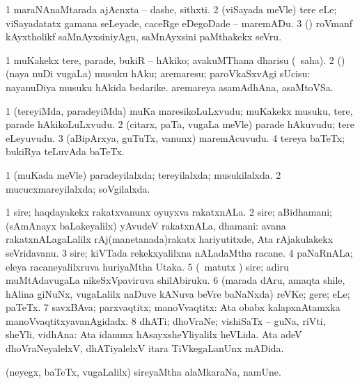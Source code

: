 \noindent 
\gl{\pagu}
\expl{}
\bmng
\bnum
\num{1}  maraNAnaMtarada ajAcnxta -- dashe, sithxti. 
\num{2}  (viSayada meVle) tere eLe; viSayadatatx gamana seLeyade, caceRge eDegoDade -- maremADu. 
\num{3}  (\kanmu) roVmanf kAyxtholikf saMnAyxsiniyAgu, saMnAyxsini paMthakekx seVru. 
\enum
\emng
\eentry

\bentry 
{} 
\gl{\sakirx}
\expl{}
\bmng
\bnum
\num{1} muKakekx tere, parade, bukiR -- hAkiko; avakuMThana dharisu (\akirx\ saha). 
\num{2} (\rUpa) (naya nuDi \mo vugaLa) musuku hAku; aremaresu; paroVkaSxvAgi sUcisu:  nayanuDiya musuku hAkida bedarike.  aremareya asamAdhAna, asaMtoVSa. 
\enum
\emng
\eentry

\bentry
{} 
\gl{\nA}
\expl{}
\bmng
\bnum
\num{1} (tereyiMda, paradeyiMda) muKa maresikoLuLxvudu; muKakekx musuku, tere, parade hAkikoLuLxvudu. 
\num{2} (citarx, paTa, \mo vugaLa meVle) parade hAkuvudu; tere eLeyuvudu. 
\num{3} (aBipArxya, guTuTx, \mo vanunx) maremAcuvudu. 
\num{4} tereya baTeTx; bukiRya teLuvAda baTeTx. 
\enum
\emng
\eentry

\bentry
{} 
\gl{\gu}
\expl{}
\bmng
\bnum
\num{1} (muKada meVle) paradeyilalxda; tereyilalxda; musukilalxda. 
\num{2} mucucxmareyilalxda; soVgilalxda. 
\enum
\emng
\eentry

\bentry
{} 
\gl{\nA}
\expl{}
\bmng
\bnum
\num{1} sire; haqdayakekx rakatxvanunx oyuyxva rakatxnALa. 
\num{2} sire; aBidhamani; (sAmAnayx baLakeyalilx) yAvudeV rakatxnALa, dhamani:  avana rakatxnALagaLalilx rAj(manetanada)rakatx hariyutitxde, Ata rAjakulakekx seVridavanu. 
\num{3} sire; kiVTada rekekxyalilxna nALadaMtha racane. 
\num{4} paNaRnALa; eleya racaneyalilxruva huriyaMtha Utaka. 
\num{5} (\BUvi\ matutx \gaNi) sire; adiru muMtAdavugaLa nikeSxVpaviruva shilAbiruku. 
\num{6} (marada dAru, amaqta shile, hAlina giNuNx, \mo vugaLalilx naDuve kANuva beVre baNaNxda) reVKe; gere; eLe; paTeTx. 
\num{7} savxBAva; parxvaqtitx; manoVvaqtitx:  Ata obabx kalapxnAtamxka manoVvaqtitxyavanAgidadx. 
\num{8} dhATi; dhoVraNe; vishiSaTx -- guNa, riVti, sheYli, vidhAna:  Ata idanunx hAsayxsheYliyalilx heVLida.  Ata adeV dhoVraNeyalelxV, dhATiyalelxV itara TiVkegaLanUnx mADida. 
\enum
\emng
\eentry

\bentry
{} 
\gl{\nA}
\expl{}
\bmng
 (neyegx, baTeTx, \mo vugaLalilx) sireyaMtha alaMkaraNa, namUne. 
\emng
\eentry


